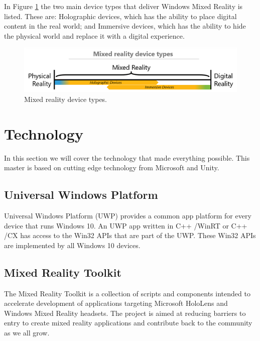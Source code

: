     In Figure \ref{fig:mrdevicetypes} the two main device types that deliver Windows Mixed Reality is listed. These are: Holographic devices, which has the ability to place digital content in the real world;\cite{wdc-mr} and Immersive devices, which has the ability to hide the physical world and replace it with a digital experience.\cite{wdc-mr} 
    \begin{figure}[h!]
        \centering
        \includegraphics[scale=1]{figures/mixedrealityspectrumdevicetypes.png}
        \caption{Mixed reality device types.\cite{wdc-mr}}
        \label{fig:mrdevicetypes}
    \end{figure}

\section{Technology}
In this section we will cover the technology that made everything possible. This master is based on cutting edge technology from Microsoft and Unity.

    \subsection{Universal Windows Platform}
    Universal Windows Platform (UWP) provides a common app platform for every device that runs Windows 10. An UWP app written in C++ /WinRT or C++ /CX has access to the Win32 APIs that are part of the UWP. These Win32 APIs are implemented by all Windows 10 devices.
    
    \subsection{Mixed Reality Toolkit}
    The Mixed Reality Toolkit is a collection of scripts and components intended to accelerate development of applications targeting Microsoft HoloLens and Windows Mixed Reality headsets. The project is aimed at reducing barriers to entry to create mixed reality applications and contribute back to the community as we all grow. %

